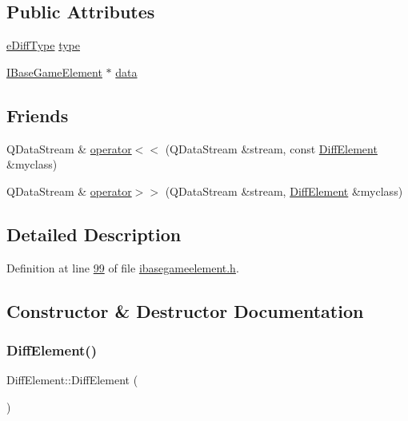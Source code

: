 \subsection*{Public Attributes}
\begin{DoxyCompactItemize}
\item 
\hyperlink{a00047_ab32e61d383765a32bc5f9efebb4b9f55}{e\+Diff\+Type} \hyperlink{a00141_ad5d4aeee742d315da4f48e7f0b0218db}{type}
\item 
\hyperlink{a00137}{I\+Base\+Game\+Element} $\ast$ \hyperlink{a00141_a656245277c76d03d7c20a55c54db6fef}{data}
\end{DoxyCompactItemize}
\subsection*{Friends}
\begin{DoxyCompactItemize}
\item 
Q\+Data\+Stream \& \hyperlink{a00141_a68d5973a4f23de0696d5c164b9a14397}{operator$<$$<$} (Q\+Data\+Stream \&stream, const \hyperlink{a00141}{Diff\+Element} \&myclass)
\item 
Q\+Data\+Stream \& \hyperlink{a00141_ac0d28f7b0a0c877592716bf643a1d8bd}{operator$>$$>$} (Q\+Data\+Stream \&stream, \hyperlink{a00141}{Diff\+Element} \&myclass)
\end{DoxyCompactItemize}


\subsection{Detailed Description}


Definition at line \hyperlink{a00047_source_l00099}{99} of file \hyperlink{a00047_source}{ibasegameelement.\+h}.



\subsection{Constructor \& Destructor Documentation}
\mbox{\label{a00141_abb725fa0a448bf536959a5c469556599}} 
\subsubsection{\texorpdfstring{Diff\+Element()}{DiffElement()}\hspace{0.1cm}{\footnotesize\ttfamily [1/2]}}
{\footnotesize\ttfamily Diff\+Element\+::\+Diff\+Element (\begin{DoxyParamCaption}{ }\end{DoxyParamCaption})\hspace{0.3cm}{\ttfamily [inline]}}



